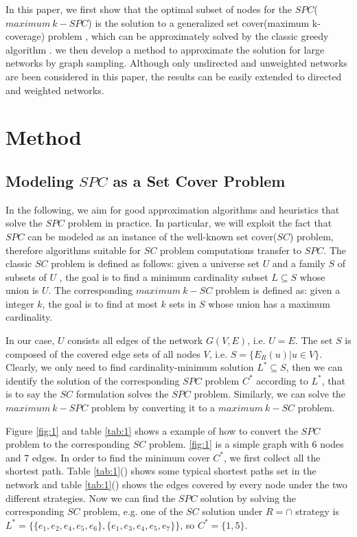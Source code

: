 \documentclass[review]{elsarticle}
\begin{document}
In this paper, we first show that the optimal subset of nodes for the $SPC$($maximum \  k-SPC$) is the solution to a generalized set cover(maximum k-coverage) problem \cite{karp1972reducibility}, which can be  approximately solved by the classic greedy algorithm \cite{chvatal1979greedy, vazirani2013approximation}. we then develop a method to approximate the solution for large networks by graph sampling. Although only undirected and unweighted networks are been considered in this paper, the results can be easily extended to directed and weighted networks.

\section{Method}

\subsection{Modeling $SPC$ as a Set Cover Problem}

In the following, we aim for good approximation algorithms and heuristics that solve the $SPC$ problem in practice. In particular, we will exploit the fact that $SPC$ can be modeled as an instance of the well-known set cover($SC$) problem, therefore algorithms suitable for $SC$ problem computations transfer to $SPC$. The classic $SC$ problem is defined as follows: given a universe set $U$ and a family $S$ of subsets of $U$ , the goal is to find a minimum cardinality subset $L \subseteq S$ whose union is $U$. The corresponding $maximum \  k-SC$ problem is defined as: given a integer $k$, the goal is to find at most $k$ sets in $S$ whose union has a maximum cardinality.

In our case,  $U$ consists all edges of the network $G(V,E)$, i.e. $U=E$. The set $S$ is composed of the covered edge sets of all nodes $V$, i.e. $S=\{E_R(u)|u \in V\}$. Clearly, we only need to find cardinality-minimum solution $L^* \subseteq S$, then we can identify the solution of the corresponding $SPC$ problem $C^*$ according to $L^*$, that is to say the $SC$ formulation solves the $SPC$ problem. Similarly, we can solve the $maximum \  k-SPC$ problem by converting it to a $maximum \  k-SC$ problem.

Figure \ref{fig:1} and table \ref{tab:1} shows a example of how to convert the $SPC$ problem to the corresponding $SC$ problem. \ref{fig:1} is a simple graph with 6 nodes and 7 edges. In order to find the minimum cover $C^*$, we first collect all the shortest path. Table \ref{tab:1}() shows some typical shortest paths set in the network and table \ref{tab:1}() shows the edges covered by every node under the two different strategies. Now we can find the $SPC$ solution by solving the corresponding $SC$ problem, e.g. one of the $SC$ solution under $R=\cap$ strategy is $L^*=\{\{e_1,e_2,e_4,e_5,e_6\},\{e_1,e_3,e_4,e_5,e_7\} \}$, so $C^*=\{1,5\}$.
\end{document}

